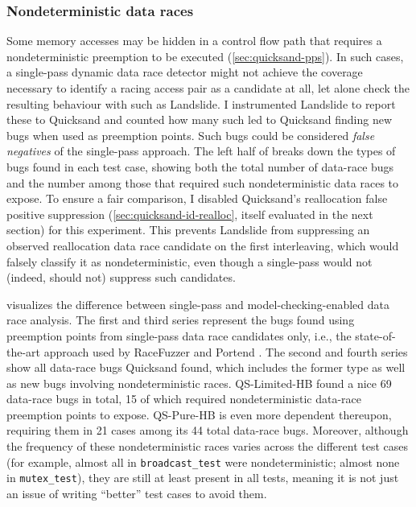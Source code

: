 \subsubsection{Nondeterministic data races}

Some memory accesses may be hidden in a control flow path that requires a nondeterministic preemption to be executed
(\cref{sec:quicksand-pps}).
In such cases, a single-pass dynamic data race detector
might not achieve the coverage necessary
to identify a racing access pair as a candidate at all,
let alone check the resulting behaviour with such as Landslide.
I instrumented Landslide to report these to Quicksand
and counted how many such led to Quicksand finding new bugs when used as preemption points.
Such bugs could be considered {\em false negatives} of the single-pass approach.
The left half of 
breaks down the types of bugs
found in each test case,
showing both the total number of data-race bugs
and the number among those that required such nondeterministic data races to expose.
%
To ensure a fair comparison, I disabled Quicksand's reallocation false positive suppression
(\cref{sec:quicksand-id-realloc}, itself evaluated in the next section)
for this experiment.
This prevents Landslide from suppressing an observed reallocation data race candidate on the first interleaving,
which would falsely classify it as nondeterministic,
even though a single-pass would not (indeed, should not) suppress such candidates.

visualizes the difference between single-pass and model-checking-enabled data race analysis.
The first and third series represent the bugs found using preemption points from single-pass data race candidates only,
i.e., the state-of-the-art approach used by RaceFuzzer \cite{racefuzzer} and Portend \cite{portend}.
The second and fourth series show all data-race bugs Quicksand found,
which includes the former type as well as new bugs involving nondeterministic races.
QS-Limited-HB found a nice 69 data-race bugs in total, %
15 of which %
required nondeterministic data-race preemption points to expose.
QS-Pure-HB is even more dependent thereupon, %
requiring them in 21 cases among its 44 total data-race bugs.
Moreover, although the frequency
of these nondeterministic races varies across the different test cases
(for example, almost all in {\tt broadcast\_test} were nondeterministic; almost none in {\tt mutex\_test}),
they are still at least present in all tests,
meaning it is not just an issue of writing ``better'' test cases to avoid them.

